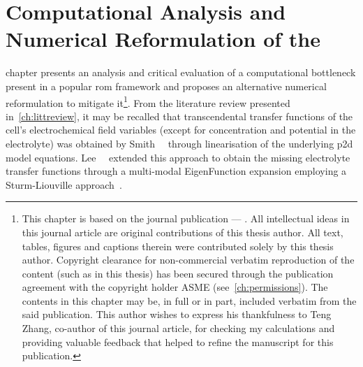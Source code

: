 
\chapter{Computational Analysis and Numerical Reformulation of the }\label{ch:improveddra}
\startcontents[chapters]

\bigskip

 chapter presents  an analysis and critical  evaluation of a
computational bottleneck present  in a popular \gls{rom}  framework and proposes
an  alternative numerical  reformulation  to  mitigate it\footnote{This  chapter
is  based  on the  journal  publication  --- .  All
intellectual  ideas  in  this  journal article  are  original  contributions  of
this  thesis  author.  All  text,  tables, figures  and  captions  therein  were
contributed solely by this thesis author. Copyright clearance for non-commercial
verbatim  reproduction  of  the  content  (such as  in  this  thesis)  has  been
secured  through  the  publication  agreement with  the  copyright  holder  ASME
(see~\cref{ch:permissions}). The contents in this chapter  may be, in full or in
part, included verbatim from the said publication. This author wishes to express
his  thankfulness  to  Teng  Zhang,  co-author  of  this  journal  article,  for
checking  my  calculations  and  providing  valuable  feedback  that  helped  to
refine  the  manuscript  for  this publication.}.  From  the  literature  review
presented  in~\cref{ch:littreview},  it  may  be  recalled  that  transcendental
transfer  functions  of  the  cell's  electrochemical  field  variables  (except
for  concentration   and  potential   in  the   electrolyte)  was   obtained  by
Smith~\etal~\cite{Smith2007} through  linearisation of the  underlying \gls{p2d}
model  equations. Lee~\etal~\cite{Lee2012a,Lee2012}  extended  this approach  to
obtain  the  missing  electrolyte   transfer  functions  through  a  multi-modal
EigenFunction expansion employing a Sturm-Liouville approach~\cite{Pryce1993}.


